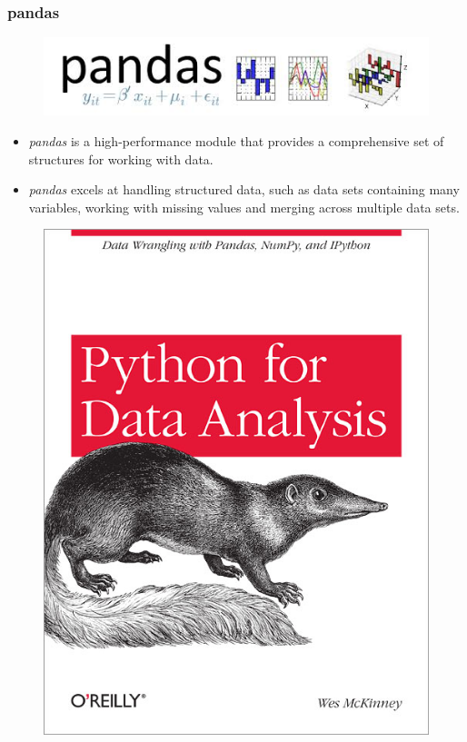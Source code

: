 \documentclass[MASTER.tex]{subfiles}
\begin{document}
	\begin{frame}
		\frametitle{pandas}
		\large
		\begin{figure}
			\centering
			\includegraphics[width=0.7\linewidth]{pandaslogo}
		\end{figure}
		\begin{itemize}
			\item \textit{pandas} is a high-performance module that provides a comprehensive set of structures for working with
			data. 
			\item \textit{pandas} excels at handling structured data, such as data sets containing many variables, working with
			missing values and merging across multiple data sets. 
		\end{itemize}
	\end{frame}
\begin{frame}
\begin{figure}
\centering
\includegraphics[width=0.55\linewidth]{pydatabook}

\end{figure}


\end{frame}
\end{document}
